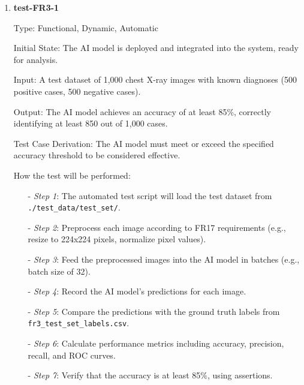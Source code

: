 \documentclass[12pt, titlepage]{article}
\begin{document}
\begin{enumerate}

\item \textbf{test-FR3-1} \label{test-FR3-1}

Type: Functional, Dynamic, Automatic

Initial State: The AI model is deployed and integrated into the system, ready for analysis.

Input: A test dataset of 1,000 chest X-ray images with known diagnoses (500 positive cases, 500 negative cases).

Output: The AI model achieves an accuracy of at least 85\%, correctly identifying at least 850 out of 1,000 cases.

Test Case Derivation: The AI model must meet or exceed the specified accuracy threshold to be considered effective.

How the test will be performed:
\begin{itemize}
  \item[-] \textit{Step 1}: The automated test script will load the test dataset from \texttt{./test\_data/test\_set/}.
  \item[-] \textit{Step 2}: Preprocess each image according to FR17 requirements (e.g., resize to 224x224 pixels, normalize pixel values).
  \item[-] \textit{Step 3}: Feed the preprocessed images into the AI model in batches (e.g., batch size of 32).
  \item[-] \textit{Step 4}: Record the AI model's predictions for each image.
  \item[-] \textit{Step 5}: Compare the predictions with the ground truth labels from \texttt{fr3\_test\_set\_labels.csv}.
  \item[-] \textit{Step 6}: Calculate performance metrics including accuracy, precision, recall, and ROC curves.
  \item[-] \textit{Step 7}: Verify that the accuracy is at least 85\%, using assertions.
\end{itemize}

\end{enumerate}
\end{document}
